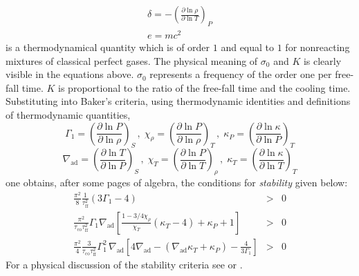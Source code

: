 \documentclass{aa}
\begin{document}
   \begin{equation}
   \begin{array}{l}
      \delta = - \left(
                    \frac{ \partial \ln \rho }{ \partial \ln T }
                 \right)_P \\
      e=mc^2
   \end{array}
   \end{equation}
   is a thermodynamical quantity which is of order $1$ and equal to $1$
   for nonreacting mixtures of classical perfect gases. The physical
   meaning of $ \sigma_0 $ and $K$ is clearly visible in the equations
   above. $\sigma_0$ represents a frequency of the order one per
   free-fall time. $K$ is proportional to the ratio of the free-fall
   time and the cooling time. Substituting into Baker's criteria, using
   thermodynamic identities and definitions of thermodynamic quantities,
   \begin{displaymath}
      \Gamma_1      = \left( \frac{ \partial \ln P}{ \partial\ln \rho}
                           \right)_{S}    \, , \;
      \chi^{}_\rho  = \left( \frac{ \partial \ln P}{ \partial\ln \rho}
                           \right)_{T}    \, , \;
      \kappa^{}_{P} = \left( \frac{ \partial \ln \kappa}{ \partial\ln P}
                           \right)_{T}
   \end{displaymath}
   \begin{displaymath}
      \nabla_{\mathrm{ad}} = \left( \frac{ \partial \ln T}
                             { \partial\ln P} \right)_{S} \, , \;
      \chi^{}_T       = \left( \frac{ \partial \ln P}
                             { \partial\ln T} \right)_{\rho} \, , \;
      \kappa^{}_{T}   = \left( \frac{ \partial \ln \kappa}
                             { \partial\ln T} \right)_{T}
   \end{displaymath}
   one obtains, after some pages of algebra, the conditions for
   \emph{stability\/} given
   below:
   \begin{eqnarray}
      \frac{\pi^2}{8} \frac{1}{\tau_{\mathrm{ff}}^2}
                ( 3 \Gamma_1 - 4 )
         & > & 0 \label{ZSDynSta} \\
      \frac{\pi^2}{\tau_{\mathrm{co}}
                   \tau_{\mathrm{ff}}^2}
                   \Gamma_1 \nabla_{\mathrm{ad}}
                   \left[ \frac{ 1- 3/4 \chi^{}_\rho }{ \chi^{}_T }
                          ( \kappa^{}_T - 4 )
                        + \kappa^{}_P + 1
                   \right]
        & > & 0 \label{ZSSecSta} \\
     \frac{\pi^2}{4} \frac{3}{\tau_{ \mathrm{co} }
                              \tau_{ \mathrm{ff} }^2
                             }
         \Gamma_1^2 \, \nabla_{\mathrm{ad}} \left[
                                   4 \nabla_{\mathrm{ad}}
                                   - ( \nabla_{\mathrm{ad}} \kappa^{}_T
                                     + \kappa^{}_P
                                     )
                                   - \frac{4}{3 \Gamma_1}
                                \right]
        & > & 0   \label{ZSVibSta}
   \end{eqnarray}
%
   For a physical discussion of the stability criteria see \citet{baker} or \citet{cox}.
\end{document}
